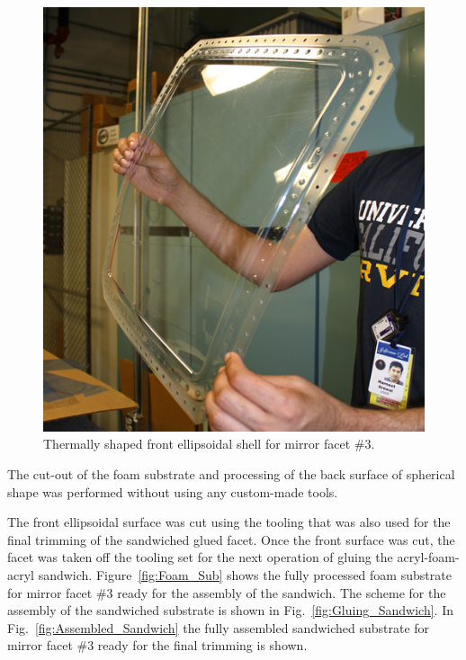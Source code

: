 \begin{figure}[ht]
    \centering
    \includegraphics[width=0.90\linewidth]{images/Front_Shell.png}
    \caption{Thermally shaped front ellipsoidal shell for mirror facet \#3.}
    \label{fig:Shell}
\end{figure}

The cut-out of the foam substrate and processing of the back surface of spherical shape was performed without
using any custom-made tools.%

The front ellipsoidal surface was cut using the tooling that was also used for the final trimming of the sandwiched
glued facet. Once the front surface was cut, the facet was taken off the tooling set for the next operation of
gluing the acryl-foam-acryl sandwich. Figure~\ref{fig:Foam_Sub} shows the fully processed foam substrate for
mirror facet \#3 ready for the assembly of the sandwich. The scheme for the assembly of the sandwiched substrate
is shown in Fig.~\ref{fig:Gluing_Sandwich}. In Fig.~\ref{fig:Assembled_Sandwich} the fully assembled sandwiched
substrate for mirror facet \#3 ready for the final trimming is shown. 

